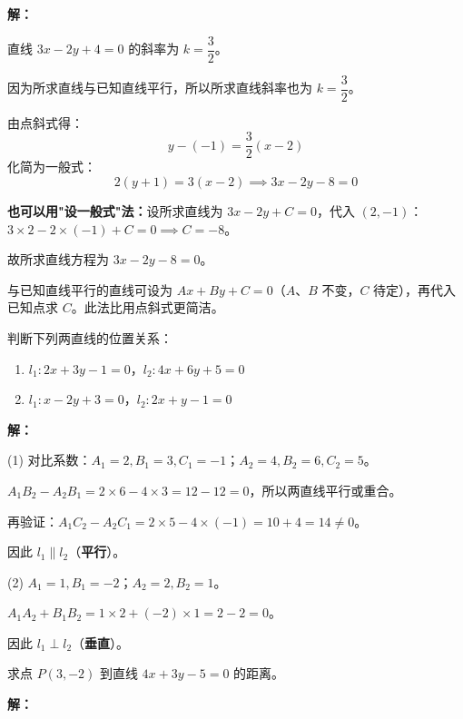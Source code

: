 \documentclass[12pt, a4paper]{ctexart}
\begin{document}
\textbf{解：}

直线 $3x - 2y + 4 = 0$ 的斜率为 $k = \dfrac{3}{2}$。

因为所求直线与已知直线平行，所以所求直线斜率也为 $k = \dfrac{3}{2}$。

由点斜式得：
\[
y - (-1) = \frac{3}{2}(x - 2)
\]
化简为一般式：
\[
2(y + 1) = 3(x - 2) \implies 3x - 2y - 8 = 0
\]

\textbf{也可以用"设一般式"法：}设所求直线为 $3x - 2y + C = 0$，代入 $(2, -1)$：
$3 \times 2 - 2 \times (-1) + C = 0 \implies C = -8$。

故所求直线方程为 $\boxed{3x - 2y - 8 = 0}$。

\begin{tipbox}[方法总结]
与已知直线平行的直线可设为 $Ax + By + C = 0$（$A$、$B$ 不变，$C$ 待定），再代入已知点求 $C$。此法比用点斜式更简洁。
\end{tipbox}

\bigskip

\begin{examplebox}[【例题3】两直线的位置关系]
判断下列两直线的位置关系：
\begin{enumerate}[label=(\arabic*)]
  \item $l_1: 2x + 3y - 1 = 0$，$l_2: 4x + 6y + 5 = 0$
  \item $l_1: x - 2y + 3 = 0$，$l_2: 2x + y - 1 = 0$
\end{enumerate}
\end{examplebox}

\textbf{解：}

(1) 对比系数：$A_1 = 2, B_1 = 3, C_1 = -1$；$A_2 = 4, B_2 = 6, C_2 = 5$。

$A_1B_2 - A_2B_1 = 2 \times 6 - 4 \times 3 = 12 - 12 = 0$，所以两直线平行或重合。

再验证：$A_1C_2 - A_2C_1 = 2 \times 5 - 4 \times (-1) = 10 + 4 = 14 \neq 0$。

因此 $l_1 \parallel l_2$（\textbf{平行}）。

(2) $A_1 = 1, B_1 = -2$；$A_2 = 2, B_2 = 1$。

$A_1A_2 + B_1B_2 = 1 \times 2 + (-2) \times 1 = 2 - 2 = 0$。

因此 $l_1 \perp l_2$（\textbf{垂直}）。

\bigskip

\begin{examplebox}[【例题4】点到直线的距离]
求点 $P(3, -2)$ 到直线 $4x + 3y - 5 = 0$ 的距离。
\end{examplebox}

\textbf{解：}
\end{document}
